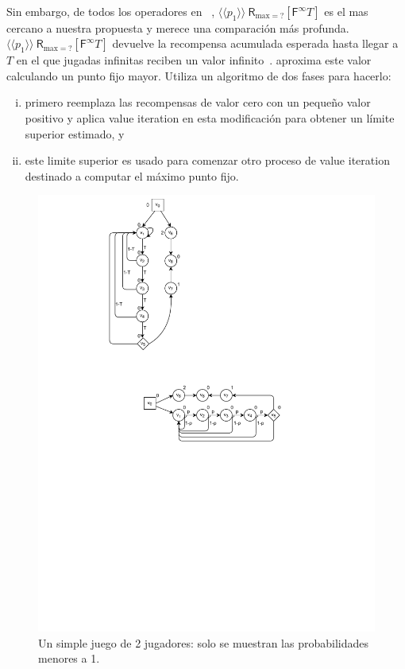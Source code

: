 Sin embargo, de todos los operadores en ~\cite{DBLP:journals/fmsd/ChenFKPS13,SvorenovaKwiatkowska16,DBLP:conf/cav/KwiatkowskaN0S20}, $\langle \langle p_1 \rangle \rangle \ \textsf{R}_{\text{max}{=}?}[\textsf{F}^{\infty} T]$ es el mas cercano a nuestra propuesta y merece una comparación más profunda. $\langle \langle p_1 \rangle \rangle \ \textsf{R}_{\text{max}{=}?}[\textsf{F}^{\infty} T]$ devuelve la recompensa acumulada esperada hasta llegar a $ T$ en el que jugadas infinitas reciben un valor infinito~\cite{DBLP:journals/fmsd/ChenFKPS13,DBLP:conf/cav/KwiatkowskaN0S20}.
{\Prism} aproxima este valor calculando un punto fijo mayor. Utiliza un algoritmo de dos fases para hacerlo:
\begin{enumerate}[(i)]
\item%
  primero reemplaza las recompensas de valor cero con un pequeño valor positivo y aplica value iteration en esta modificación para obtener un límite superior estimado, y
\item%
  este limite superior es usado para comenzar otro proceso de value iteration destinado a computar el máximo punto fijo.
\end{enumerate}
%
\begin{figure}
\vspace{-4ex}
\centering
\includegraphics[scale=0.60]{Figs/prism-cex-1-horiz.pdf}%
\caption{Un simple juego de 2 jugadores: solo se muestran las probabilidades menores a 1.} \label{fig:prism-cex-1}
\end{figure}
